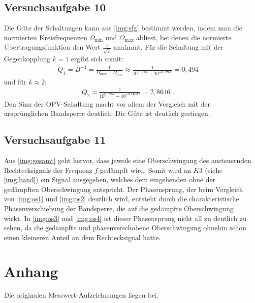 \documentclass[numbers=noenddot,12pt,a4paper]{scrartcl}
\newcommand{\ix}[1]{_\text{#1}}
\begin{document}
\subsection{Versuchsaufgabe 10}
Die Güte der Schaltungen kann aus \ref{img:sfg} bestimmt werden, indem man die normierten Kreisfrequenzen $\Omega\ix{min}$ und $\Omega\ix{max}$ abliest, bei denen die normierte Übertragungsfunktion den Wert $\frac{1}{\sqrt{2}}$ annimmt. Für die Schaltung mit der Gegenkopplung $k=1$ ergibt sich somit: 
\begin{align*}
Q_1=B^{-1}=\frac{1}{\Omega\ix{max}-\Omega\ix{min}}\approx\frac{1}{10^{0,3884}-10^{-0,3768}}=0,494
\end{align*}
und für $k\approx2$:
\begin{align*}
Q_2\approx\frac{1}{10^{0,0755}-10^{-0,06412}}=2,8616 \; .
\end{align*}
Den Sinn der OPV-Schaltung macht vor allem der Vergleich mit der ursprünglichen Bandsperre deutlich: Die Güte ist deutlich gestiegen.
\subsection{Versuchsaufgabe 11}
Aus \ref{img:gesamt} geht hervor, dass jeweils eine Oberschwingung des ansteuernden Rechtecksignals der Frequenz $f$ gedämpft wird. Somit wird an $K3$ (siehe \ref{img:band}) ein Signal ausgegeben, welches dem eingehenden ohne der gedämpften Oberschwingung entspricht. Der Phasensprung, der beim Vergleich von \ref{img:os1} und \ref{img:os2} deutlich wird, entsteht durch die charakteristische Phasenverschiebung der Bandsperre, die auf die gedämpfte Oberschwingung wirkt. In \ref{img:os3} und \ref{img:os4} ist dieser Phasensprung nicht all zu deutlich zu sehen, da die gedämpfte und phasenverschobene Oberschwingung ohnehin schon einen kleineren Anteil an dem Rechtecksignal hatte. 
\section{Anhang}
Die originalen Messwert-Aufzeichnungen liegen bei.
\end{document}
